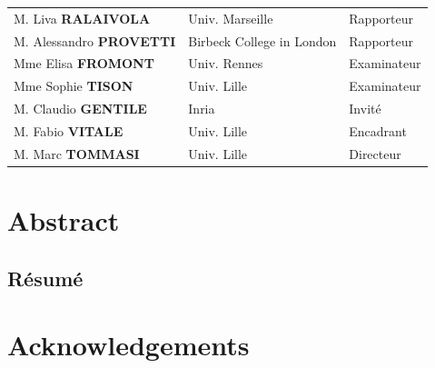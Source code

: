 \documentclass[a4paper,svgnames,twoside,onecolumn,final,titlepage,11pt]{book}
\begin{document}
\begin{titlepage}
\begin{center}
\vspace{0.3cm}
\begin{large}
  \begin{tabular}{l@{\hskip 0.6in}l@{\hskip 0.5in}l}
    M. Liva \textbf{RALAIVOLA}      & Univ. Marseille           & Rapporteur  \\
    M. Alessandro \textbf{PROVETTI} & Birbeck College in London & Rapporteur  \\
    Mme Elisa \textbf{FROMONT}      & Univ. Rennes              & Examinateur \\
    Mme Sophie \textbf{TISON}       & Univ. Lille               & Examinateur \\
    M. Claudio \textbf{GENTILE}     & Inria                     & Invité      \\
    M. Fabio \textbf{VITALE}        & Univ. Lille               & Encadrant   \\
    M. Marc \textbf{TOMMASI}        & Univ. Lille               & Directeur   \\
  \end{tabular}
\end{large}

\end{center}\restoregeometry

\end{titlepage}


\maketitle
\frontmatter

\section*{Abstract}


\begin{otherlanguage}{french}
  \section*{Résumé}
  
\end{otherlanguage}

\section*{Acknowledgements}
\label{sec:acknowledgements}


\tableofcontents
\listoffigures
\listoftables
\newpage
\end{document}
